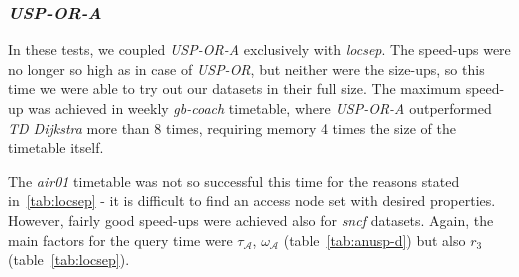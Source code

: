 	\subsubsection{\textit{USP-OR-A}}
	
		\noindent In these tests, we coupled \textit{USP-OR-A} exclusively with \textit{locsep}. The speed-ups were no longer so high as in case of \textit{USP-OR}, but neither were the size-ups, so this time we were able to try out our datasets in their full size. The maximum speed-up was achieved in weekly \textit{gb-coach} timetable, where \textit{USP-OR-A} outperformed \textit{TD Dijkstra} more than 8 times, requiring memory 4 times the size of the timetable itself.
		
		The \textit{air01} timetable was not so successful this time for the reasons stated in~\ref{tab:locsep} - it is difficult to find an access node set with desired properties. However, fairly good speed-ups were achieved also for \textit{sncf} datasets. Again, the main factors for the query time were $\tau_{\mathcal{A}}$, $\omega_{\mathcal{A}}$ (table~\ref{tab:anusp-d}) but also $r_{3}$ (table~\ref{tab:locsep}).
	
